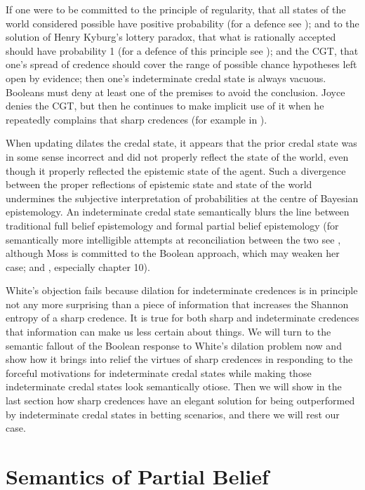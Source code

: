 \documentclass[11pt]{article}
\begin{document}
If one were to be committed to the principle of regularity, that all
states of the world considered possible have positive probability (for
a defence see ); and to the solution of
Henry Kyburg's lottery paradox, that what is rationally accepted
should have probability 1 (for a defence of this principle see
); and the CGT, that one's spread of
credence should cover the range of possible chance hypotheses left
open by evidence; then one's indeterminate credal state is always
vacuous. Booleans must deny at least one of the premises to avoid the
conclusion. Joyce denies the CGT, but then he continues to make
implicit use of it when he repeatedly complains that sharp credences
 (for example in ).

When updating dilates the credal state, it appears that the prior
credal state was in some sense incorrect and did not properly reflect
the state of the world, even though it properly reflected the
epistemic state of the agent. Such a divergence between the proper
reflections of epistemic state and state of the world undermines the
subjective interpretation of probabilities at the centre of Bayesian
epistemology. An indeterminate credal state semantically blurs the
line between traditional full belief epistemology and formal partial
belief epistemology (for semantically more intelligible attempts at
reconciliation between the two see , although Moss
is committed to the Boolean approach, which may weaken her case; and
, especially chapter 10).

White's objection fails because dilation for indeterminate credences
is in principle not any more surprising than a piece of information
that increases the Shannon entropy of a sharp credence. It is true for
both sharp and indeterminate credences that information can make us
less certain about things. We will turn to the semantic fallout of the
Boolean response to White's dilation problem now and show how it
brings into relief the virtues of sharp credences in responding to the
forceful motivations for indeterminate credal states while making
those indeterminate credal states look semantically otiose. Then we
will show in the last section how sharp credences have an elegant
solution for being outperformed by indeterminate credal states in
betting scenarios, and there we will rest our case.

\section{Semantics of Partial Belief} 
\label{SemanticsOfPartialBelief}
\end{document}
